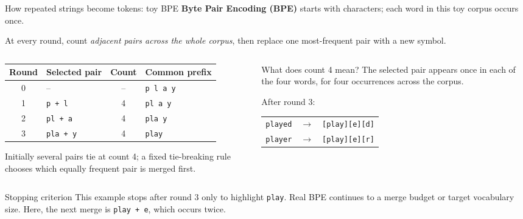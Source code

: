 \begin{frame}{How repeated strings become tokens: toy BPE}
  \footnotesize
  \textbf{Byte Pair Encoding (BPE)} starts with characters; each word in this
  toy corpus occurs once.

  \vspace{0.15em}
  {\centering
    \quad
    \quad
    \quad
    \par
  }

  At every round, count \emph{adjacent pairs across the whole corpus}, then
  replace one most-frequent pair with a new symbol.

  \vspace{0.2em}
  \begin{columns}[T]
    \begin{column}{0.59\textwidth}
      \centering
      {\scriptsize
      \begin{tabular}{clcl}
        \textbf{Round} & \textbf{Selected pair} & \textbf{Count} &
          \textbf{Common prefix} \\
        \hline
        0 & --                 & -- & \texttt{p l a y} \\
        1 & \texttt{p + l}    & 4  & \texttt{pl a y} \\
        2 & \texttt{pl + a}   & 4  & \texttt{pla y} \\
        3 & \texttt{pla + y}  & 4  & \texttt{play} \\
      \end{tabular}
      }

      \vspace{0.4em}
      {\scriptsize Initially several pairs tie at count 4; a fixed tie-breaking
      rule chooses which equally frequent pair is merged first.}
    \end{column}
    \begin{column}{0.37\textwidth}
      \begin{block}{What does count 4 mean?}
        The selected pair appears once in each of the four words, for four
        occurrences across the corpus.
      \end{block}

      \centering
      After round 3:\par\smallskip
      {\scriptsize
      \begin{tabular}{rcl}
        \texttt{played} & $\rightarrow$ &
          \texttt{[play][e][d]} \\
        \texttt{player} & $\rightarrow$ &
          \texttt{[play][e][r]}
      \end{tabular}
      }
    \end{column}
  \end{columns}

  \vfill
  \begin{alertblock}{Stopping criterion}
    This example stops after round 3 only to highlight \texttt{play}. Real BPE
    continues to a merge budget or target vocabulary size. Here, the next merge
    is \texttt{play + e}, which occurs twice.
  \end{alertblock}
\end{frame}

